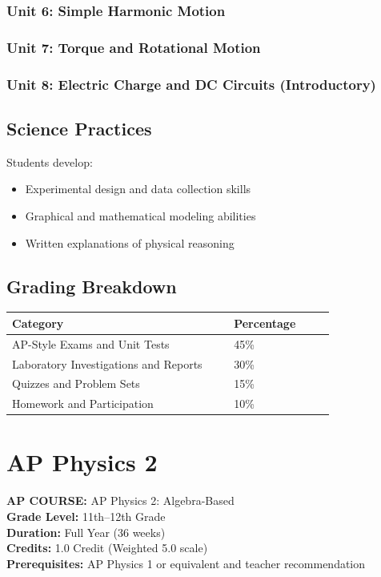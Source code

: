 \documentclass[12pt,oneside]{book}
\begin{document}
\subsection*{Unit 6: Simple Harmonic Motion}
\subsection*{Unit 7: Torque and Rotational Motion}
\subsection*{Unit 8: Electric Charge and DC Circuits (Introductory)}

\section{Science Practices}
Students develop:
\begin{itemize}[leftmargin=2em]
    \item Experimental design and data collection skills
    \item Graphical and mathematical modeling abilities
    \item Written explanations of physical reasoning
\end{itemize}

\section{Grading Breakdown}
\begin{center}
\begin{tabular}{L{0.55\linewidth}L{0.25\linewidth}}
\toprule
\textbf{Category} & \textbf{Percentage} \\
\midrule
AP-Style Exams and Unit Tests & 45\% \\
Laboratory Investigations and Reports & 30\% \\
Quizzes and Problem Sets & 15\% \\
Homework and Participation & 10\% \\
\bottomrule
\end{tabular}
\end{center}

\chapter{AP Physics 2}

\noindent\textbf{AP COURSE:} AP Physics 2: Algebra-Based\\
\textbf{Grade Level:} 11th--12th Grade\\
\textbf{Duration:} Full Year (36 weeks)\\
\textbf{Credits:} 1.0 Credit (Weighted 5.0 scale)\\
\textbf{Prerequisites:} AP Physics 1 or equivalent and teacher recommendation
\end{document}
